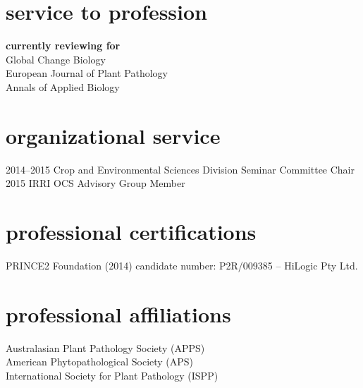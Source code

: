         \section*{service to profession}
        \textbf{currently reviewing for}\\
        Global Change Biology\\
        European Journal of Plant Pathology\\
        Annals of Applied Biology\\

      \section*{organizational service}
        \begin{entrylist}
          \entry
        	{2014--2015}
        	{Crop and Environmental Sciences Division Seminar Committee Chair}
        	{}
        	{}
	      \entry
	        {2015}
        	{IRRI OCS Advisory Group Member}
        	{}
        	{}
        \end{entrylist}
        \section*{professional certifications}
        PRINCE2 Foundation (2014) candidate number: P2R/009385 – HiLogic Pty Ltd.

        \section*{professional affiliations}
        Australasian Plant Pathology Society (APPS)\\
        American Phytopathological Society (APS)\\
        International Society for Plant Pathology (ISPP)\\
